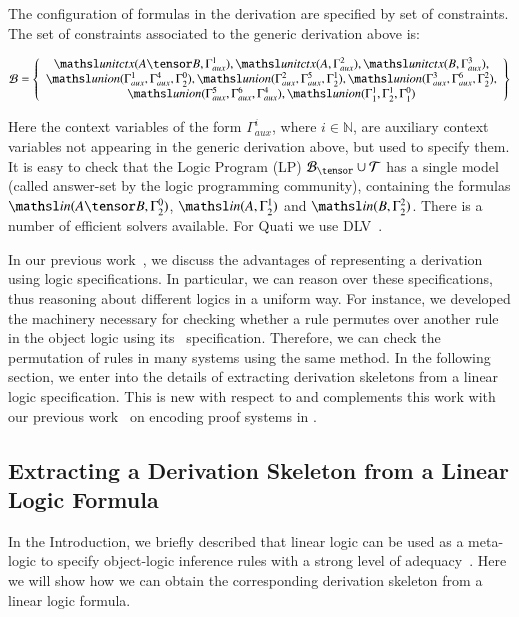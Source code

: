 \documentclass{ebl}
\newcommand{\elin}[2]{\ensuremath{{\tsl{unitctx}(\ensuremath{#1}, \ensuremath{#2})}}}
\newcommand{\union}[3]{\ensuremath{{\tsl{union}(\ensuremath{#1},\ensuremath{#2},\ensuremath{ #3})}}}
\newcommand{\In}[2]{\ensuremath{\tsl{in}(\ensuremath{#1},\ensuremath{#2})}}
\begin{document}
The configuration of formulas in the derivation are specified by set of constraints.
The set of constraints associated to the generic derivation above is:
\begin{small}
\[
\Bscr = \left\{
\begin{array}{c}
\elin{A \tensor B}{\Gamma_{aux}^1},
\elin{A}{\Gamma_{aux}^2},
\elin{B}{\Gamma_{aux}^3}, \\
\union{\Gamma_{aux}^1}{\Gamma_{aux}^4}{\Gamma^{0}_{2}},
\union{\Gamma_{aux}^2}{\Gamma_{aux}^5}{\Gamma^{1}_{2}}, 
\union{\Gamma_{aux}^3}{\Gamma_{aux}^6}{\Gamma^{2}_{2}},\\
\union{\Gamma_{aux}^5}{\Gamma_{aux}^6}{\Gamma_{aux}^4},
\union{\Gamma^1_1}{\Gamma^1_2}{\Gamma^0_1}
\end{array}
\right\}
\]
\end{small}%
Here the context variables of the form $\Gamma_{aux}^i$, where $i \in \mathbb{N}$, are 
auxiliary context variables not appearing in the generic derivation above, 
but used to specify them. It is easy to check that the Logic Program (LP) $\Bscr_\tensor \cup \Tscr$
has a single model (called answer-set by the logic programming community), 
containing the formulas $\In{A \tensor B}{\Gamma^{0}_{2}}$,
$\In{A}{\Gamma^{1}_{2}}$ and $\In{B}{\Gamma^{2}_{2}}$. There is a number of efficient 
solvers available. For Quati we use DLV~\cite{leone06tcl}.

In our previous work~\cite{nigam13iclp}, we discuss the advantages of representing 
a derivation using logic specifications. In particular, we can reason over
these specifications, thus reasoning about different logics in a uniform way.
For instance, we developed the machinery necessary for checking whether a rule
permutes over another rule in the object logic using its \sell\ specification.
Therefore, we can check the permutation of rules in many systems using the same
method.
In the following section, we enter into the details of extracting derivation skeletons
from a linear logic specification. This is new with respect to \cite{nigam13iclp} and 
complements this work with our previous work~\cite{nigam.jlc} on encoding proof
systems in \sell. 

\subsection{Extracting a Derivation Skeleton from a Linear Logic Formula}
\label{sec:extract}

In the Introduction, we briefly described that linear logic can be used as a meta-logic 
to specify object-logic inference rules with a strong level of 
adequacy~\cite{nigam10jar}. Here we will show how we can obtain the corresponding
derivation skeleton from a linear logic formula. 
\end{document}
